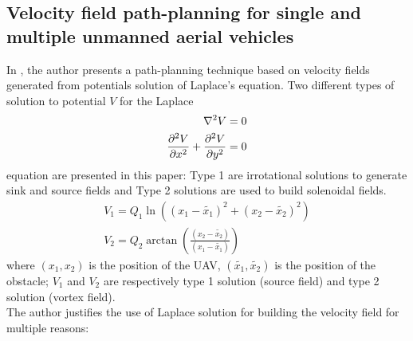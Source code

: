 \subsection{Velocity field path-planning for single and multiple unmanned aerial vehicles}
In \cite{farinha2020unmanned}, the author presents a path-planning technique based on velocity fields generated from potentials solution of Laplace's equation.
Two different types of solution to potential $V$ for the Laplace 
\begin{align} %
    \laplacian{V} &=0 \nonumber \\
    \frac{\partial^2 V}{\partial x^2}+\dpd[2]{V}{y} &=0 \label{eq:Laplace} %
\end{align}
equation are presented in this paper: Type 1 are irrotational solutions to generate sink and source fields and Type 2 solutions are used to build solenoidal fields.
\begin{align} %
    {V}_{1} = {Q}_{1} \ln(({x}_{1}-\tilde{{x}_{1}})^2+({x}_{2}-\tilde{{x}_{2}})^2) \label{eqn:potentiallogdistance} \\
    {V}_{2} = {Q}_{2} \arctan(\frac{({x}_{2}-\tilde{{x}_{2}})}{({x}_{1}-\tilde{{x}_{1}})})
\end{align}
where $({x}_{1},{x}_{2})$ is the position of the UAV, $(\tilde{{x}_{1}}, \tilde{{x}_{2}})$ is the position of the obstacle;
${V}_{1}$ and ${V}_{2}$ are respectively type 1 solution (source field) and type 2 solution (vortex field). \\
The author justifies the use of Laplace solution for building the velocity field for multiple reasons:
